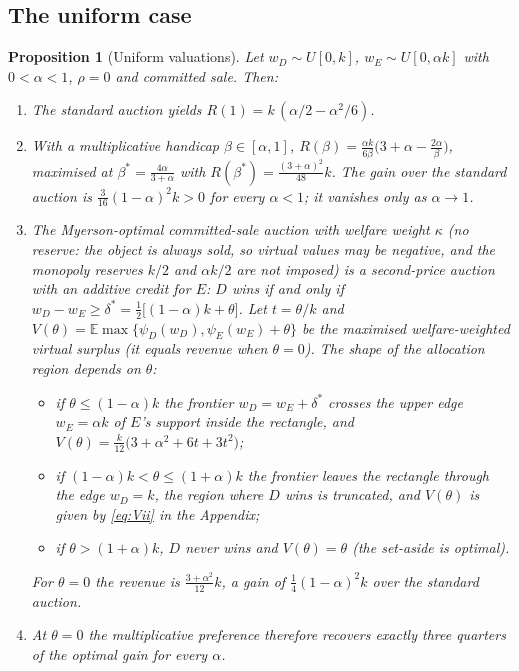 \documentclass[12pt,a4paper]{article}
\newtheorem{proposition}{Proposition}
\theoremstyle{definition}
\theoremstyle{remark}
\newcommand{\E}{\mathbb{E}}
\begin{document}
\subsection{The uniform case}

\begin{proposition}[Uniform valuations]\label{prop:uniform}
Let $w_D\sim U[0,k]$, $w_E\sim U[0,\alpha k]$ with $0<\alpha<1$, $\rho=0$ and committed sale. Then:
\begin{enumerate}
\item[(a)] The standard auction yields $R(1)=k\,(\alpha/2-\alpha^2/6)$.
\item[(b)] With a multiplicative handicap $\beta\in[\alpha,1]$, $R(\beta)=\frac{\alpha k}{6\beta}\big(3+\alpha-\frac{2\alpha}{\beta}\big)$, maximised at $\beta^*=\frac{4\alpha}{3+\alpha}$ with $R(\beta^*)=\frac{(3+\alpha)^2}{48}k$. The gain over the standard auction is $\frac{3}{16}(1-\alpha)^2k>0$ for \emph{every} $\alpha<1$; it vanishes only as $\alpha\to1$.
\item[(c)] The Myerson-optimal \emph{committed-sale} auction with welfare weight $\kappa$ (no reserve: the object is always sold, so virtual values may be negative, and the monopoly reserves $k/2$ and $\alpha k/2$ are not imposed) is a second-price auction with an additive credit for $E$: $D$ wins if and only if $w_D-w_E\ge\delta^*=\tfrac12\big[(1-\alpha)k+\theta\big]$. Let $t=\theta/k$ and $V(\theta)=\E\max\{\psi_D(w_D),\psi_E(w_E)+\theta\}$ be the maximised welfare-weighted virtual surplus (it equals revenue when $\theta=0$). The shape of the allocation region depends on $\theta$:
\begin{itemize}
\item if $\theta\le(1-\alpha)k$ the frontier $w_D=w_E+\delta^*$ crosses the upper edge $w_E=\alpha k$ of $E$'s support inside the rectangle, and $V(\theta)=\frac{k}{12}\big(3+\alpha^2+6t+3t^2\big)$;
\item if $(1-\alpha)k<\theta\le(1+\alpha)k$ the frontier leaves the rectangle through the edge $w_D=k$, the region where $D$ wins is truncated, and $V(\theta)$ is given by \eqref{eq:Vii} in the Appendix;
\item if $\theta>(1+\alpha)k$, $D$ never wins and $V(\theta)=\theta$ (the set-aside is optimal).
\end{itemize}
For $\theta=0$ the revenue is $\frac{3+\alpha^2}{12}k$, a gain of $\frac14(1-\alpha)^2k$ over the standard auction.
\item[(d)] At $\theta=0$ the multiplicative preference therefore recovers exactly three quarters of the optimal gain for every $\alpha$.
\end{enumerate}
\end{proposition}
\end{document}
